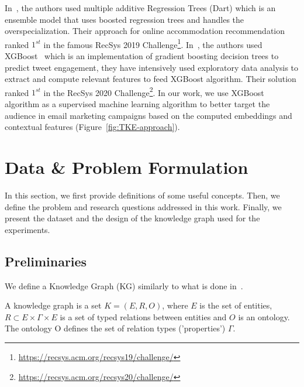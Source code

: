 \documentclass[11pt,dvipdfm]{article}
\begin{document}
In~\cite{Pawel19}, the authors used multiple additive Regression Trees (Dart) which is an ensemble model that uses boosted regression trees and handles the overspecialization. Their approach for online accommodation recommendation ranked $1^{st}$ in the famous RecSys 2019 Challenge\footnote{\url{https://recsys.acm.org/recsys19/challenge/}}. In~\cite{Schifferer20}, the authors used XGBoost~\cite{Chen16} which is an implementation of gradient boosting decision trees to predict tweet engagement, they have intensively used exploratory data analysis to extract and compute relevant features to feed XGBoost algorithm. Their solution ranked $1^{st}$ in the RecSys 2020 Challenge\footnote{\url{https://recsys.acm.org/recsys20/challenge/}}.
In our work, we use XGBoost algorithm as a supervised machine learning algorithm to better target the audience in email marketing campaigns based on the computed embeddings and contextual features (Figure~\ref{fig:TKE-approach}).

\section{Data \& Problem Formulation}
\label{sec:data-problem-formulation}
In this section, we first provide definitions of some useful concepts. Then, we define the problem and research questions addressed in this work. Finally, we present the dataset and the design of the knowledge graph used for the experiments.

\subsection{Preliminaries}
\label{sec:preliminaries}
We define a Knowledge Graph (KG) similarly to what is done in~\cite{Dadoun19}.

\begin{definition}
\label{def:KG}
A knowledge graph is a set \begin{math} K = (E,R,O) \end{math}, where \begin{math} E \end{math} is the set of entities, \begin{math} R \subset E \times \Gamma \times E \end{math} is a set of typed relations between entities and \begin{math} O  \end{math} is an ontology. The ontology O defines
the set of relation types ('properties') $\Gamma$.
\end{definition}
\end{document}
